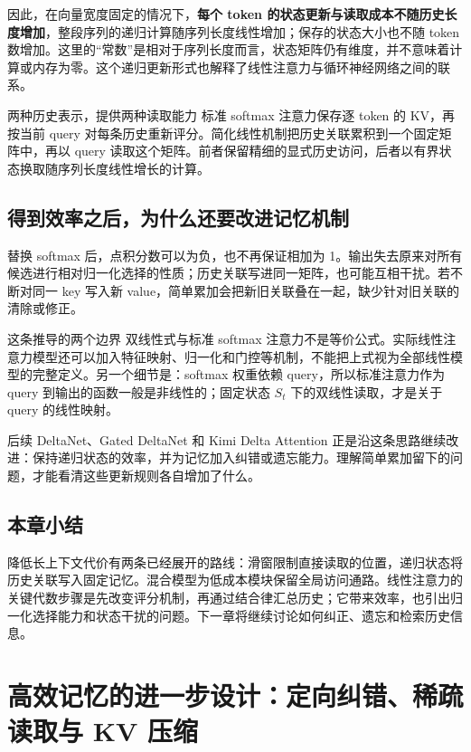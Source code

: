 \documentclass[11pt,a4paper]{article}
\begin{document}
因此，在向量宽度固定的情况下，\textbf{每个 token 的状态更新与读取成本不随历史长度增加}，整段序列的递归计算随序列长度线性增加；保存的状态大小也不随 token 数增加。这里的“常数”是相对于序列长度而言，状态矩阵仍有维度，并不意味着计算或内存为零。这个递归更新形式也解释了线性注意力与循环神经网络之间的联系。

\begin{importantbox}{两种历史表示，提供两种读取能力}
标准 softmax 注意力保存逐 token 的 KV，再按当前 query 对每条历史重新评分。简化线性机制把历史关联累积到一个固定矩阵中，再以 query 读取这个矩阵。前者保留精细的显式历史访问，后者以有界状态换取随序列长度线性增长的计算。
\end{importantbox}

\subsection{得到效率之后，为什么还要改进记忆机制}

替换 softmax 后，点积分数可以为负，也不再保证相加为 1。输出失去原来对所有候选进行相对归一化选择的性质；历史关联写进同一矩阵，也可能互相干扰。若不断对同一 key 写入新 value，简单累加会把新旧关联叠在一起，缺少针对旧关联的清除或修正。

\begin{warningbox}{这条推导的两个边界}
双线性式与标准 softmax 注意力不是等价公式。实际线性注意力模型还可以加入特征映射、归一化和门控等机制，不能把上式视为全部线性模型的完整定义。另一个细节是：softmax 权重依赖 query，所以标准注意力作为 query 到输出的函数一般是非线性的；固定状态 $S_t$ 下的双线性读取，才是关于 query 的线性映射。
\end{warningbox}

后续 DeltaNet、Gated DeltaNet 和 Kimi Delta Attention 正是沿这条思路继续改进：保持递归状态的效率，并为记忆加入纠错或遗忘能力。理解简单累加留下的问题，才能看清这些更新规则各自增加了什么。

\subsection{本章小结}

降低长上下文代价有两条已经展开的路线：滑窗限制直接读取的位置，递归状态将历史关联写入固定记忆。混合模型为低成本模块保留全局访问通路。线性注意力的关键代数步骤是先改变评分机制，再通过结合律汇总历史；它带来效率，也引出归一化选择能力和状态干扰的问题。下一章将继续讨论如何纠正、遗忘和检索历史信息。



\clearpage
\section{高效记忆的进一步设计：定向纠错、稀疏读取与 KV 压缩}
\end{document}
